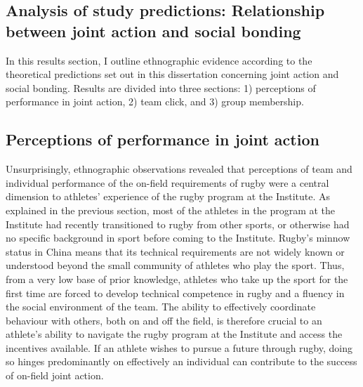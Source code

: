                                       \begin{CJK}{UTF8}{gbsn}









\section{Analysis of study predictions: Relationship between joint action and social bonding}

In this results section, I outline ethnographic evidence according to the theoretical predictions set out in this dissertation concerning joint action and social bonding. Results are divided into three sections: 1) perceptions of performance in joint action, 2) team click, and 3) group membership.




\subsection{Perceptions of performance in joint action}
Unsurprisingly, ethnographic observations revealed that perceptions of team and individual performance of the on-field requirements of rugby were a central dimension to athletes' experience of the rugby program at the Institute.  As explained in the previous section, most of the athletes in the program at the Institute had recently transitioned to rugby from other sports, or otherwise had no specific background in sport before coming to the Institute.  Rugby's minnow status in China means that its technical requirements are not widely known or understood beyond the small community of athletes who play the sport.  Thus, from a very low base of prior knowledge, athletes who take up the sport for the first time are forced to develop technical competence in rugby and a fluency in the social environment of the team.  The ability to effectively coordinate behaviour with others, both on and off the field, is therefore crucial to an athlete's ability to navigate the rugby program at the Institute and access the incentives available. If an athlete wishes to pursue a future through rugby, doing so hinges predominantly on effectively an individual can contribute to the success of on-field joint action.


\end{CJK}
